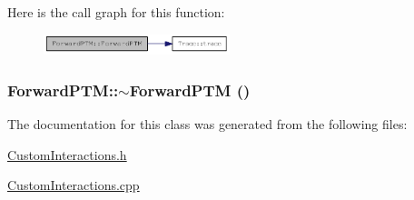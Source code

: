 Here is the call graph for this function:\nopagebreak
\begin{figure}[H]
\begin{center}
\leavevmode
\includegraphics[width=154pt]{classForwardPTM_a42913d0481561a489b8664cd22cf7b0c_cgraph}
\end{center}
\end{figure}
\hypertarget{classForwardPTM_a9fa8aa77099a6bb8d4fbe326a5d84704}{
\subsubsection[{$\sim$ForwardPTM}]{\setlength{\rightskip}{0pt plus 5cm}ForwardPTM::$\sim$ForwardPTM ()}}
\label{classForwardPTM_a9fa8aa77099a6bb8d4fbe326a5d84704}


The documentation for this class was generated from the following files:\begin{DoxyCompactItemize}
\item 
\hyperlink{CustomInteractions_8h}{CustomInteractions.h}\item 
\hyperlink{CustomInteractions_8cpp}{CustomInteractions.cpp}\end{DoxyCompactItemize}
